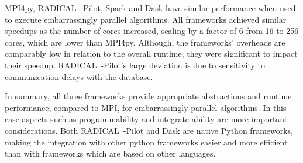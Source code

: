 MPI4py, RADICAL~-Pilot, Spark and Dask have similar performance when used to execute embarrassingly parallel algorithms.
All frameworks achieved similar speedups as the number of cores increased, scaling by a factor of 6 from 16 to 256 cores, which are lower than MPI4py.
Although, the frameworks' overheads are comparably low in relation to the overall runtime, they were significant to impact their speedup.
RADICAL~-Pilot's large deviation is due to sensitivity to communication delays with the database.

In summary, all three frameworks provide appropriate abstractions and runtime performance, compared to MPI, for embarrassingly parallel algorithms. 
In this case aspects such as programmability and integrate-ability are more important considerations.
Both RADICAL~-Pilot and Dask are native Python frameworks, making the integration with other python frameworks easier and more efficient than with frameworks which are based on other languages.



